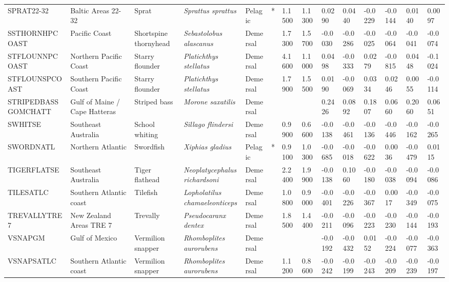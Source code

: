 \begin{longtable}{p{2.8cm}p{2cm}p{1.7cm}p{1.7cm}p{1cm}p{0.3cm}p{1cm}p{1cm}p{1cm}p{1cm}p{1cm}p{1cm}p{1cm}p{1cm}}
  SPRAT22-32 & Baltic Areas 22-32 & Sprat & \textit{Sprattus sprattus} & Pelagic & * & 1.1500 & 1.1300 & 0.0290 & 0.0440 & -0.0229 & -0.0144 & 0.0140 & 0.0097 \\ 
  SSTHORNHPCOAST & Pacific Coast & Shortspine thornyhead & \textit{Sebastolobus alascanus} & Demersal &   & 1.7300 & 1.5700 & -0.0030 & -0.0286 & -0.0025 & -0.0064 & -0.0041 & -0.0074 \\ 
  STFLOUNNPCOAST & Northern Pacific Coast & Starry flounder & \textit{Platichthys stellatus} & Demersal &   & 4.1600 & 1.1000 & 0.0498 & -0.0333 & 0.0279 & -0.0815 & 0.0448 & -0.1024 \\ 
  STFLOUNSPCOAST & Southern Pacific Coast & Starry flounder & \textit{Platichthys stellatus} & Demersal &   & 1.7900 & 1.5500 & 0.0190 & -0.0069 & 0.0334 & 0.0246 & 0.0055 & -0.0114 \\ 
  STRIPEDBASSGOMCHATT & Gulf of Maine / Cape Hatteras & Striped bass & \textit{Morone saxatilis} & Demersal &  &  &  & 0.2426 & 0.0892 & 0.1807 & 0.0660 & 0.2060 & 0.0651 \\ 
  SWHITSE & Southeast Australia & School whiting & \textit{Sillago flindersi} & Demersal &   & 0.9900 & 0.6600 & -0.0138 & -0.0461 & -0.0136 & -0.0446 & -0.0162 & -0.0265 \\ 
  SWORDNATL & Northern Atlantic & Swordfish & \textit{Xiphias gladius} & Pelagic & * & 0.9100 & 1.0300 & -0.0685 & -0.0018 & -0.0622 & 0.0036 & -0.0479 & 0.0115 \\ 
  TIGERFLATSE & Southeast Australia & Tiger flathead & \textit{Neoplatycephalus richardsoni} & Demersal &   & 2.2400 & 1.9900 & -0.0138 & 0.1060 & -0.0180 & -0.0038 & -0.0094 & -0.0086 \\ 
  TILESATLC & Southern Atlantic coast & Tilefish & \textit{Lopholatilus chamaeleonticeps} & Demersal &   & 1.0800 & 0.9000 & -0.0401 & -0.0226 & -0.0367 & 0.0017 & -0.0349 & -0.0075 \\ 
  TREVALLYTRE7 & New Zealand Areas TRE 7 & Trevally & \textit{Pseudocaranx dentex} & Demersal &   & 1.8500 & 1.4400 & -0.0211 & -0.0096 & -0.0223 & -0.0230 & -0.0144 & -0.0193 \\ 
  VSNAPGM & Gulf of Mexico & Vermilion snapper & \textit{Rhomboplites aurorubens} & Demersal &  &  &  & -0.0192 & -0.0432 & 0.0152 & -0.0224 & -0.0077 & -0.0363 \\ 
  VSNAPSATLC & Southern Atlantic coast & Vermilion snapper & \textit{Rhomboplites aurorubens} & Demersal &   & 1.1200 & 0.8600 & -0.0242 & -0.0199 & -0.0243 & -0.0209 & -0.0239 & -0.0197 \\ 

\end{longtable}
